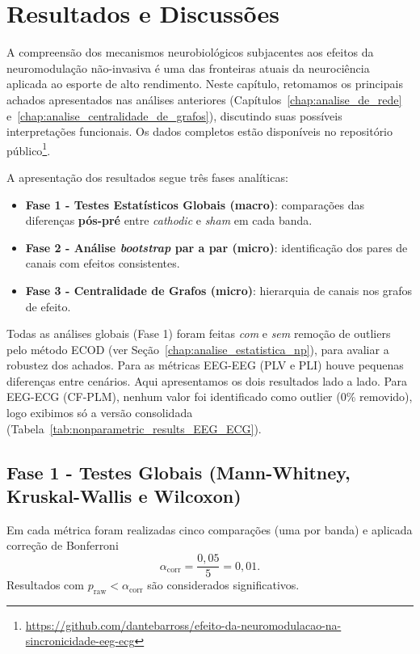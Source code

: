 \chapter{Resultados e Discussões}
\label{chap:resultados_e_discussoes}

A compreensão dos mecanismos neurobiológicos subjacentes aos efeitos da neuromodulação não-invasiva é uma das fronteiras atuais da neurociência aplicada ao esporte de alto rendimento. Neste capítulo, retomamos os principais achados apresentados nas análises anteriores (Capítulos~\ref{chap:analise_de_rede} e~\ref{chap:analise_centralidade_de_grafos}), discutindo suas possíveis interpretações funcionais. Os dados completos estão disponíveis no repositório público\footnote{\url{https://github.com/dantebarross/efeito-da-neuromodulacao-na-sincronicidade-eeg-ecg}}.

A apresentação dos resultados segue três fases analíticas:

\begin{itemize}
  \item \textbf{Fase 1 - Testes Estatísticos Globais (macro)}: comparações das diferenças \textbf{pós-pré} entre \textit{cathodic} e \textit{sham} em cada banda.
  \item \textbf{Fase 2 - Análise \textit{bootstrap} par a par (micro)}: identificação dos pares de canais com efeitos consistentes.
  \item \textbf{Fase 3 - Centralidade de Grafos (micro)}: hierarquia de canais nos grafos de efeito.
\end{itemize}

Todas as análises globais (Fase 1) foram feitas \textit{com} e \textit{sem} remoção de outliers pelo método ECOD (ver Seção~\ref{chap:analise_estatistica_np}), para avaliar a robustez dos achados. Para as métricas EEG-EEG (PLV e PLI) houve pequenas diferenças entre cenários. Aqui apresentamos os dois resultados lado a lado. Para EEG-ECG (CF-PLM), nenhum valor foi identificado como outlier (0\% removido), logo exibimos só a versão consolidada (Tabela~\ref{tab:nonparametric_results_EEG_ECG}).

\section{Fase 1 - Testes Globais (Mann-Whitney, Kruskal-Wallis e Wilcoxon)}

Em cada métrica foram realizadas cinco comparações (uma por banda) e aplicada correção de Bonferroni
\[
  \alpha_{\mathrm{corr}} = \frac{0{,}05}{5} = 0{,}01.
\]
Resultados com \(p_{\mathrm{raw}} < \alpha_{\mathrm{corr}}\) são considerados significativos.

